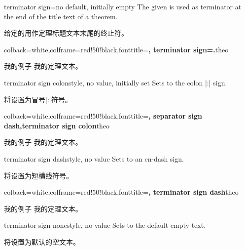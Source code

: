 \begin{docTcbKey}{terminator sign}{=}{no default, initially empty}
The given  is used as terminator at the end of the title text of a theorem.

给定的用作定理标题文本末尾的终止符。
\begin{dispExample}
%
  {colback=white,colframe=red!50!black,fonttitle=\bfseries,
   terminator sign={.}}{theo}
\begin{sometheorem}{我的例子}{}
我的定理文本。
\end{sometheorem}
\end{dispExample}
\end{docTcbKey}

\begin{docTcbKey}{terminator sign colon}{}{style, no value, initially set}
Sets  to the colon |:| sign.

将设置为冒号|:|符号。
\begin{dispExample}
%
  {colback=white,colframe=red!50!black,fonttitle=\bfseries,
   separator sign dash,terminator sign colon}{theo}
\begin{sometheorem}{我的例子}{}
我的定理文本。
\end{sometheorem}
\end{dispExample}
\end{docTcbKey}

\begin{docTcbKey}{terminator sign dash}{}{style, no value}
Sets  to an en-dash sign.

将设置为短横线符号。
\begin{dispExample}
%
  {colback=white,colframe=red!50!black,fonttitle=\bfseries,
   terminator sign dash}{theo}
\begin{sometheorem}{我的例子}{}
我的定理文本。
\end{sometheorem}
\end{dispExample}
\end{docTcbKey}

\begin{docTcbKey}{terminator sign none}{}{style, no value}
Sets  to the default empty text.

将设置为默认的空文本。
\end{docTcbKey}


